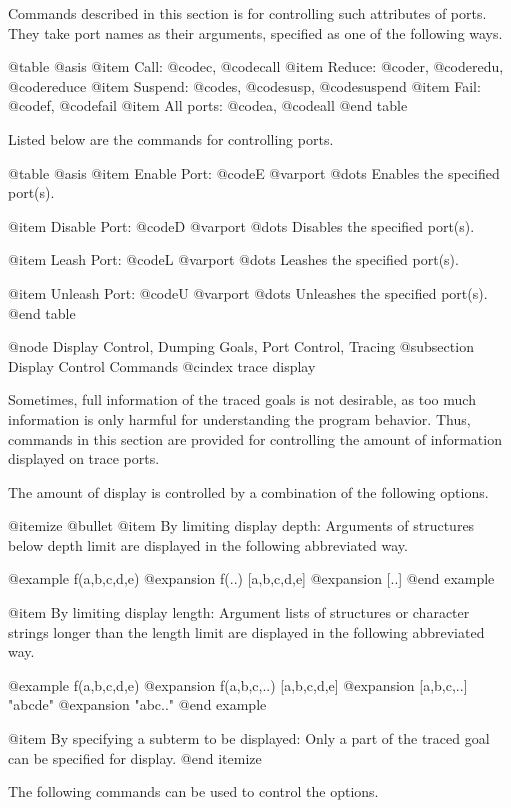 {{{{Commands described in this section is for controlling such attributes
of ports.  They take port names as their arguments, specified as one
of the following ways.

@table @asis
@item Call:
@code{c}, @code{call}
@item Reduce:
@code{r}, @code{redu}, @code{reduce}
@item Suspend:
@code{s}, @code{susp}, @code{suspend}
@item Fail:
@code{f}, @code{fail}
@item All ports:
@code{a}, @code{all}
@end table

Listed below are the commands for controlling ports.

@table @asis
@item Enable Port: @code{E} @var{port} @dots{}
Enables the specified port(s).

@item Disable Port: @code{D} @var{port} @dots{}
Disables the specified port(s).

@item Leash Port: @code{L} @var{port} @dots{}
Leashes the specified port(s).

@item Unleash Port: @code{U} @var{port} @dots{}
Unleashes the specified port(s).
@end table

@node Display Control, Dumping Goals, Port Control, Tracing
@subsection Display Control Commands
@cindex trace display

Sometimes, full information of the traced goals is not desirable, as too
much information is only harmful for understanding the program behavior.
Thus, commands in this section are provided for controlling the amount
of information displayed on trace ports.

The amount of display is controlled by a combination of the following
options.

@itemize @bullet
@item By limiting display depth:
Arguments of structures below depth limit are displayed in the following
abbreviated way.

@example
f(a,b,c,d,e)    @expansion{}    f(..)
[a,b,c,d,e]     @expansion{}    [..]
@end example

@item By limiting display length:
Argument lists of structures or character strings longer than the length
limit are displayed in the following abbreviated way.

@example
f(a,b,c,d,e)    @expansion{}    f(a,b,c,..)
[a,b,c,d,e]     @expansion{}    [a,b,c,..]
"abcde"         @expansion{}    "abc.."
@end example

@item By specifying a subterm to be displayed:
Only a part of the traced goal can be specified for display.
@end itemize

The following commands can be used to control the options.

}}}}
